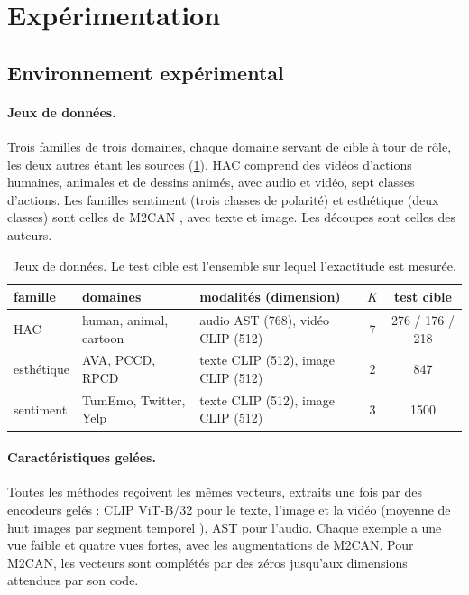 \documentclass[11pt,a4paper]{article}
\theoremstyle{definition}
\theoremstyle{remark}
\begin{document}
\section{Expérimentation}\label{sec-experimentation}

\subsection{Environnement expérimental}\label{sec-environnement}

\paragraph{Jeux de données.}
Trois familles de trois domaines, chaque domaine servant de cible à tour de rôle, les deux autres étant les sources
(\cref{tab-jeux}). HAC \citep{dong2023simmmdg} comprend des vidéos d'actions humaines, animales et de dessins animés,
avec audio et vidéo, sept classes d'actions. Les familles sentiment (trois classes de polarité) et esthétique (deux
classes) sont celles de M2CAN \citep{zhao2025msmmda}, avec texte et image. Les découpes sont celles des auteurs.

\begin{table}[ht]
\centering
\caption{Jeux de données. Le test cible est l'ensemble sur lequel l'exactitude est mesurée.}\label{tab-jeux}
\small
\begin{tabular}{l l l c c}
\toprule
famille & domaines & modalités (dimension) & $K$ & test cible \\
\midrule
HAC & human, animal, cartoon & audio AST (768), vidéo CLIP (512) & 7 & 276 / 176 / 218 \\
esthétique & AVA, PCCD, RPCD & texte CLIP (512), image CLIP (512) & 2 & 847 \\
sentiment & TumEmo, Twitter, Yelp & texte CLIP (512), image CLIP (512) & 3 & 1500 \\
\bottomrule
\end{tabular}
\end{table}

\paragraph{Caractéristiques gelées.}
Toutes les méthodes reçoivent les mêmes vecteurs, extraits une fois par des encodeurs gelés : CLIP ViT-B/32
\citep{radford2021clip} pour le texte, l'image et la vidéo (moyenne de huit images par segment temporel
\citep{wang2016tsn}), AST \citep{gong2021ast} pour l'audio. Chaque exemple a une vue faible et quatre vues fortes, avec
les augmentations de M2CAN. Pour M2CAN, les vecteurs sont complétés par des zéros jusqu'aux dimensions attendues par son
code.
\end{document}
